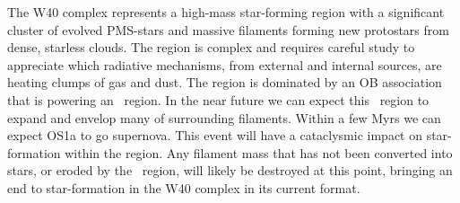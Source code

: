 The W40 complex represents a high-mass star-forming region with a significant cluster of evolved 
PMS-stars and massive filaments forming new protostars from dense, starless clouds. The region 
is complex and requires careful study to appreciate which radiative mechanisms, from external 
and internal sources, are heating clumps of gas and dust. The region is dominated by an OB 
association that is powering an \HII\ region. In the near future we can expect this \HII\ region to 
expand and envelop many of surrounding filaments. Within a few Myrs we can expect OS1a to 
go supernova. This event will have a cataclysmic impact on star-formation within the region. Any 
filament mass that has not been converted into stars, or eroded by the \HII\ region, will likely be 
destroyed at this point, bringing an end to star-formation in the W40 complex in its current format.  